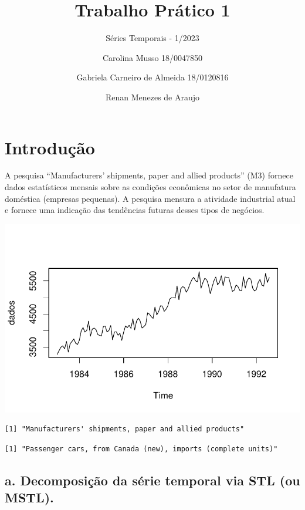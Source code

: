 \documentclass[
  letterpaper,
  DIV=11,
  numbers=noendperiod]{scrartcl}
\title{Trabalho Prático 1}
\subtitle{Séries Temporais - 1/2023}
\author{Carolina Musso 18/0047850 \and Gabriela Carneiro de Almeida
18/0120816 \and Renan Menezes de Araujo}
\date{}
\begin{document}
\maketitle
\ifdefined\Shaded\renewenvironment{Shaded}{\begin{tcolorbox}[enhanced, breakable, interior hidden, borderline west={3pt}{0pt}{shadecolor}, frame hidden, boxrule=0pt, sharp corners]}{\end{tcolorbox}}\fi

\hypertarget{introduuxe7uxe3o}{%
\section{Introdução}\label{introduuxe7uxe3o}}

A pesquisa ``Manufacturers' shipments, paper and allied products'' (M3)
fornece dados estatísticos mensais sobre as condições econômicas no
setor de manufatura doméstica (empresas pequenas). A pesquisa mensura a
atividade industrial atual e fornece uma indicação das tendências
futuras desses tipos de negócios.

\includegraphics{Trabalhao1_ST_grupo5_files/figure-pdf/unnamed-chunk-2-1.pdf}

\begin{verbatim}
[1] "Manufacturers' shipments, paper and allied products"
\end{verbatim}

\begin{verbatim}
[1] "Passenger cars, from Canada (new), imports (complete units)"
\end{verbatim}

\hypertarget{a.-decomposiuxe7uxe3o-da-suxe9rie-temporal-via-stl-ou-mstl.}{%
\subsection{a. Decomposição da série temporal via STL (ou
MSTL).}\label{a.-decomposiuxe7uxe3o-da-suxe9rie-temporal-via-stl-ou-mstl.}}
\end{document}
